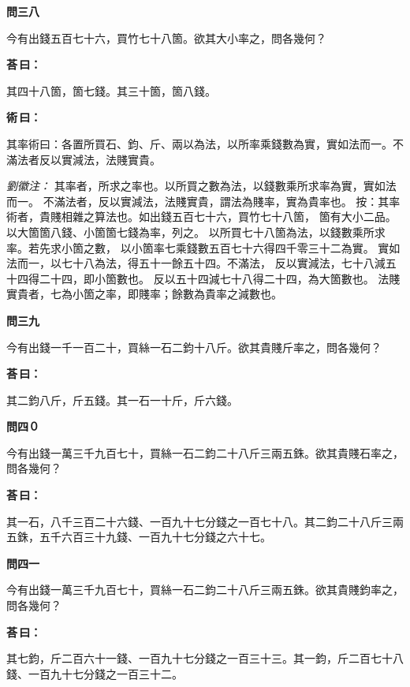 \documentclass[11pt,a4paper]{article}
\newenvironment{problem}[1][]{%
  \par\vspace{0.6em}\noindent\textcolor{problemcolor}{\textbf{問\ignorespaces#1\unskip}\hspace{0.5em}}%
  \ignorespaces
}{\par\vspace{0.4em}}
\newenvironment{answer}{%
  \par\noindent\textcolor{answercolor}{\textbf{荅\,曰：}}%
  \ignorespaces
}{\par\vspace{0.3em}}
\newenvironment{method}{%
  \par\noindent\textcolor{methodcolor}{\textbf{術\,曰：}}%
  \ignorespaces
}{\par\vspace{0.4em}}
\newenvironment{liuhuicomm}{%
  \par\vspace{0.3em}\noindent\textcolor{commentarycolor}{\small\textit{劉徽注：}}}%
  {\par\vspace{0.5em}}
\begin{document}
\begin{problem}[三八]
今有出錢五百七十六，買竹七十八箇。欲其大小率之，問各幾何？
\end{problem}

\begin{answer}
其四十八箇，箇七錢。其三十箇，箇八錢。
\end{answer}

\begin{method}
其率術曰：各置所買石、鈞、斤、兩以為法，以所率乘錢數為實，實如法而一。不滿法者反以實減法，法賤實貴。
\end{method}

\begin{liuhuicomm}
其率者，所求之率也。以所買之數為法，以錢數乘所求率為實，實如法而一。
不滿法者，反以實減法，法賤實貴，謂法為賤率，實為貴率也。
按：其率術者，貴賤相雜之算法也。如出錢五百七十六，買竹七十八箇，
箇有大小二品。以大箇箇八錢、小箇箇七錢為率，列之。
以所買七十八箇為法，以錢數乘所求率。若先求小箇之數，
以小箇率七乘錢數五百七十六得四千零三十二為實。
實如法而一，以七十八為法，得五十一餘五十四。不滿法，
反以實減法，七十八減五十四得二十四，即小箇數也。
反以五十四減七十八得二十四，為大箇數也。
法賤實貴者，七為小箇之率，即賤率；餘數為貴率之減數也。
\end{liuhuicomm}

\begin{problem}[三九]
今有出錢一千一百二十，買絲一石二鈞十八斤。欲其貴賤斤率之，問各幾何？
\end{problem}

\begin{answer}
其二鈞八斤，斤五錢。其一石一十斤，斤六錢。
\end{answer}

\begin{problem}[四０]
今有出錢一萬三千九百七十，買絲一石二鈞二十八斤三兩五銖。欲其貴賤石率之，問各幾何？
\end{problem}

\begin{answer}
其一石，八千三百二十六錢、一百九十七分錢之一百七十八。其二鈞二十八斤三兩五銖，五千六百三十九錢、一百九十七分錢之六十七。
\end{answer}

\begin{problem}[四一]
今有出錢一萬三千九百七十，買絲一石二鈞二十八斤三兩五銖。欲其貴賤鈞率之，問各幾何？
\end{problem}

\begin{answer}
其七鈞，斤二百六十一錢、一百九十七分錢之一百三十三。其一鈞，斤二百七十八錢、一百九十七分錢之一百三十二。
\end{answer}
\end{document}
